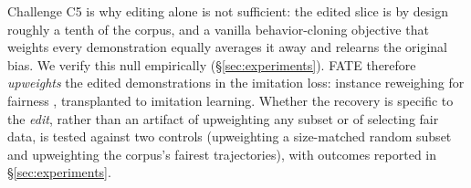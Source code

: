 Challenge C5 is why editing alone is not sufficient: the edited slice is by
design roughly a tenth of the corpus, and a vanilla
behavior-cloning objective that weights every demonstration equally averages
it away and relearns the original bias. We verify this null empirically
(\S\ref{sec:experiments}).
FATE therefore \emph{upweights} the edited
demonstrations in the imitation loss: instance reweighing for fairness
\cite{kamirancalders2012}, transplanted to imitation
learning. Whether the recovery is specific to the \emph{edit}, rather than an
artifact of upweighting any subset or of selecting fair data, is tested against
two controls (upweighting a size-matched random subset and upweighting the
corpus's fairest trajectories), with outcomes reported in
\S\ref{sec:experiments}.
